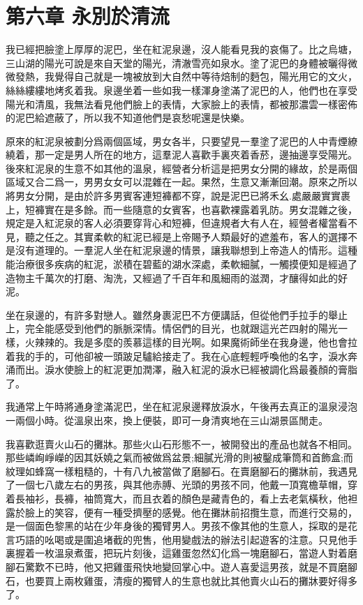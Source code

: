 \documentclass[a6paper]{article}
\begin{document}
\pagebreak

\section{第六章 永別於清流}

我已經把臉塗上厚厚的泥巴，坐在紅泥泉邊，沒人能看見我的哀傷了。比之烏塘，三山湖的陽光可說是來自天堂的陽光，清澈雪亮如泉水。塗了泥巴的身體被曬得微微發熱，我覺得自己就是一塊被放到大自然中等待焙制的麪包，陽光用它的文火，絲絲縷縷地烤炙着我。泉邊坐着一些如我一樣渾身塗滿了泥巴的人，他們也在享受陽光和清風，我無法看見他們臉上的表情，大家臉上的表情，都被那濃雲一樣密佈的泥巴給遮蔽了，所以我不知道他們是哀愁呢還是快樂。

原來的紅泥泉被劃分爲兩個區域，男女各半，只要望見一羣塗了泥巴的人中青煙繚繞着，那一定是男人所在的地方，這羣泥人喜歡手裏夾着香菸，邊抽邊享受陽光。後來紅泥泉的生意不如其他的溫泉，經營者分析這是把男女分開的緣故，於是兩個區域又合二爲一，男男女女可以混雜在一起。果然，生意又漸漸回潮。原來之所以將男女分開，是由於許多男賓客連短褲都不穿，說是泥巴已將禾幺.處嚴嚴實實裹上，短褲實在是多餘。而一些隨意的女賓客，也喜歡裸露着乳防。男女混雜之後，規定是入紅泥泉的客人必須要穿背心和短褲，但違規者大有人在，經營者權當看不見，聽之任之。其實柔軟的紅泥已經是上帝賜予人類最好的遮羞布，客人的選擇不是沒有道理的。一羣泥人坐在紅泥泉邊的情景，讓我聯想到上帝造人的情形。這種能治療很多疾病的紅泥，淤積在碧藍的湖水深處，柔軟細膩，一觸摸便知是經過了造物主千萬次的打磨、淘洗，又經過了千百年和風細雨的滋潤，才釀得如此的好泥。

坐在泉邊的，有許多對戀人。雖然身裹泥巴不方便講話，但從他們手拉手的舉止上，完全能感受到他們的脈脈深情。情侶們的目光，也就跟這光芒四射的陽光一樣，火辣辣的。我是多麼的羨慕這樣的目光啊。如果魔術師坐在我身邊，他也會拉着我的手的，可他卻被一頭跛足驢給接走了。我在心底輕輕呼喚他的名字，淚水奔涌而出。淚水使臉上的紅泥更加潤澤，融入紅泥的淚水已經被調化爲最養顏的膏脂了。

我通常上午時將通身塗滿泥巴，坐在紅泥泉邊釋放淚水，午後再去真正的溫泉浸泡一兩個小時。從溫泉出來，換上便裝，即可一身清爽地在三山湖景區閒走。

我喜歡逛賣火山石的攤牀。那些火山石形態不一，被開發出的產品也就各不相同。那些嶙峋崢嶸的因其妖嬈之氣而被做爲盆景;細膩光滑的則被鑿成筆筒和首飾盒;而紋理如蜂窩一樣粗糙的，十有八九被當做了磨腳石。在賣磨腳石的攤牀前，我遇見了一個七八歲左右的男孩，與其他赤膊、光頭的男孩不同，他戴一頂寬檐草帽，穿着長袖衫，長褲，袖筒寬大，而且衣着的顏色是藏青色的，看上去老氣橫秋，他袒露於臉上的笑容，便有一種受擠壓的感覺。他在攤牀前招攬生意，而進行交易的，是一個面色黎黑的站在少年身後的獨臂男人。男孩不像其他的生意人，採取的是花言巧語的吆喝或是圍追堵截的兜售，他用變戲法的辦法引起遊客的注意。只見他手裏握着一枚溫泉煮蛋，把玩片刻後，這雞蛋忽然幻化爲一塊磨腳石，當遊人對着磨腳石驚歎不已時，他又把雞蛋飛快地變回掌心中。遊人喜愛這男孩，就是不買磨腳石，也要買上兩枚雞蛋，清瘦的獨臂人的生意也就比其他賣火山石的攤牀要好得多了。
\end{document}
